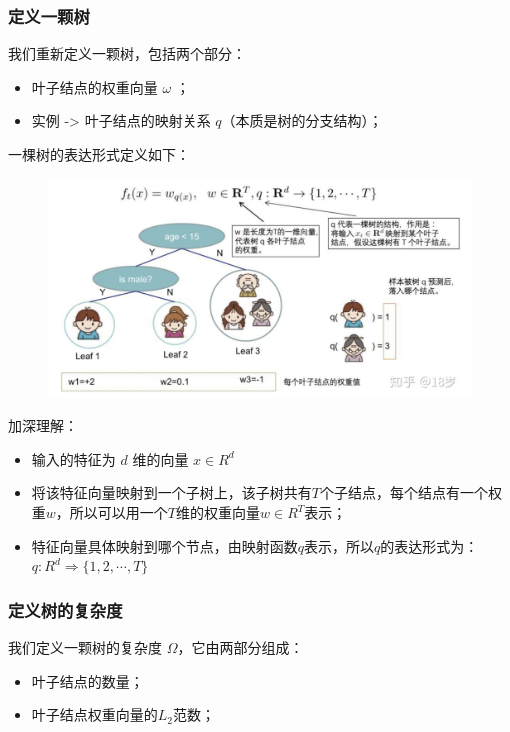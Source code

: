 \documentclass[12pt]{article}
\begin{document}
\subsubsection{定义一颗树}
我们重新定义一颗树，包括两个部分：
\begin{itemize}
\setlength{\itemsep}{0pt}
\setlength{\parsep}{0pt}
\setlength{\parskip}{0pt}
    \item 叶子结点的权重向量 $\omega$ ；
    \item 实例 -> 叶子结点的映射关系 $q$（本质是树的分支结构）；
\end{itemize}

一棵树的表达形式定义如下：
\begin{figure}[H]
    \centering
    \includegraphics[width=1\textwidth]{fig/XGBoost_Tree_Definition_Example.png}
\end{figure}

\begin{framed}
加深理解：

\begin{itemize}
\setlength{\itemsep}{0pt}
\setlength{\parsep}{0pt}
\setlength{\parskip}{0pt}
    \item 输入的特征为 $d$ 维的向量 $x \in R^d$
    \item 将该特征向量映射到一个子树上，该子树共有$T$个子结点，每个结点有一个权重$w$，所以可以用一个$T$维的权重向量$w \in R^T$表示；
    \item 特征向量具体映射到哪个节点，由映射函数$q$表示，所以$q$的表达形式为：$q: R^d \Rightarrow \{1, 2, \cdots, T\}$
\end{itemize}
\end{framed}

\subsubsection{定义树的复杂度}
我们定义一颗树的复杂度 $\Omega$，它由两部分组成：
\begin{itemize}
\setlength{\itemsep}{0pt}
\setlength{\parsep}{0pt}
\setlength{\parskip}{0pt}
    \item 叶子结点的数量；
    \item 叶子结点权重向量的$L_2$范数；
\end{itemize}
\end{document}
